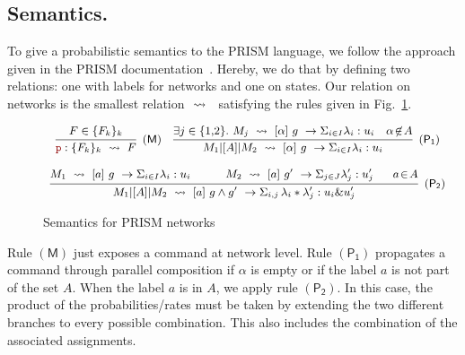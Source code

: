 \subsection{Semantics.} To give a probabilistic semantics to the PRISM
language, we follow the approach given in the PRISM
documentation~\cite{PRISMdoc}.  Hereby, we do that by defining two
relations: one with labels for networks and one on states. Our
relation on networks is the smallest relation $\ \stackrel{}{\rightsquigarrow}\ {}$
satisfying the rules given in Fig.~\ref{fig:semantics}.
\begin{figure}[h]
  \begin{displaymath}\small
    \begin{array}{ccc}
      \infer[\mathsf{(M)}]
      { {\role{p}:\{F_k\}_k} \prismred{} F
      }
      {
      F\in\{F_k\}_k
      }
      \quad
      \infer[\mathsf{(P_1)}]
      {M_1\ppp A M_2\prismred{}\command {\alpha}g\lambda u
      }
      {
      \exists j\in\{1,\!2\}.\ 
      M_j\prismred{} \command {\alpha}g\lambda u
      & \alpha\!\not\in\! A
        }
      \\\\
      \infer[\mathsf{(P_2)}]
      {M_1\ppp A M_2\prismred{}
      \commandBase a{g\land g'}
      {\Sigma_{i,j}\,\lambda_i*\lambda'_j}: {u_i\& u'_j} 
      }
      {
      M_1\prismred{}\command {a}g\lambda u
      \quad&\quad 
        M_2\prismred{}\commandBase {a} {g'} \Sigma_{j\in J}\lambda'_j: u'_j
      \ &\
             a\!\in\! A}
    \end{array}
  \end{displaymath}
  \caption{Semantics for PRISM networks} 
  \label{fig:semantics}
\end{figure}
Rule $\mathsf{(M)}$ just exposes a command at network level. Rule
$\mathsf{(P_1)}$ propagates a command through parallel composition if
$\alpha$ is empty or if the label $a$ is not part of the set $A$. When
the label $a$ is in $A$, we apply rule $\mathsf{(P_2)}$. In this case,
the product of the probabilities/rates must be taken by extending the
two different branches to every possible combination. This also
includes the combination of the associated assignments.

